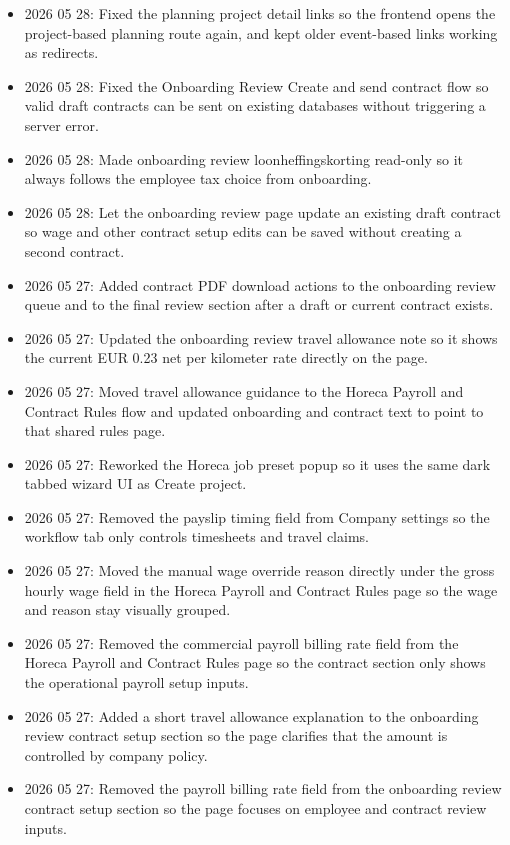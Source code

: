 \documentclass[11pt]{article}
\begin{document}
\begin{itemize}
    \item 2026 05 28: Fixed the planning project detail links so the frontend opens the project-based planning route again, and kept older event-based links working as redirects.
    \item 2026 05 28: Fixed the Onboarding Review Create and send contract flow so valid draft contracts can be sent on existing databases without triggering a server error.
    \item 2026 05 28: Made onboarding review loonheffingskorting read-only so it always follows the employee tax choice from onboarding.
    \item 2026 05 28: Let the onboarding review page update an existing draft contract so wage and other contract setup edits can be saved without creating a second contract.
    \item 2026 05 27: Added contract PDF download actions to the onboarding review queue and to the final review section after a draft or current contract exists.
    \item 2026 05 27: Updated the onboarding review travel allowance note so it shows the current EUR 0.23 net per kilometer rate directly on the page.
    \item 2026 05 27: Moved travel allowance guidance to the Horeca Payroll and Contract Rules flow and updated onboarding and contract text to point to that shared rules page.
    \item 2026 05 27: Reworked the Horeca job preset popup so it uses the same dark tabbed wizard UI as Create project.
    \item 2026 05 27: Removed the payslip timing field from Company settings so the workflow tab only controls timesheets and travel claims.
    \item 2026 05 27: Moved the manual wage override reason directly under the gross hourly wage field in the Horeca Payroll and Contract Rules page so the wage and reason stay visually grouped.
    \item 2026 05 27: Removed the commercial payroll billing rate field from the Horeca Payroll and Contract Rules page so the contract section only shows the operational payroll setup inputs.
    \item 2026 05 27: Added a short travel allowance explanation to the onboarding review contract setup section so the page clarifies that the amount is controlled by company policy.
    \item 2026 05 27: Removed the payroll billing rate field from the onboarding review contract setup section so the page focuses on employee and contract review inputs.

\end{itemize}
\end{document}

